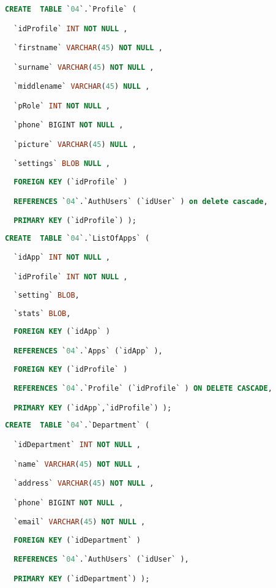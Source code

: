\begin{Code}
\begin{lstlisting}[language=SQL,breaklines=true, label=createProfile, caption=Create Profile, ]
CREATE  TABLE `04`.`Profile` (

  `idProfile` INT NOT NULL ,

  `firstname` VARCHAR(45) NOT NULL ,

  `surname` VARCHAR(45) NOT NULL ,

  `middlename` VARCHAR(45) NULL ,

  `pRole` INT NOT NULL ,

  `phone` BIGINT NOT NULL ,

  `picture` VARCHAR(45) NULL ,

  `settings` BLOB NULL ,
  
  FOREIGN KEY (`idProfile` )

  REFERENCES `04`.`AuthUsers` (`idUser` ) on delete cascade,

  PRIMARY KEY (`idProfile`) );
\end{lstlisting}
\end{Code}

\begin{Code}
\begin{lstlisting}[language=SQL,breaklines=true, label=createListOfApps, caption=Create ListOfApps, ]
CREATE  TABLE `04`.`ListOfApps` (

  `idApp` INT NOT NULL ,

  `idProfile` INT NOT NULL ,
  
  `setting` BLOB,
  
  `stats` BLOB,
  
  FOREIGN KEY (`idApp` )

  REFERENCES `04`.`Apps` (`idApp` ),
  
  FOREIGN KEY (`idProfile` )

  REFERENCES `04`.`Profile` (`idProfile` ) ON DELETE CASCADE,

  PRIMARY KEY (`idApp`,`idProfile`) );

\end{lstlisting}
\end{Code}

\begin{Code}
\begin{lstlisting}[language=SQL,breaklines=true, label=createDepartment, caption=Create Department, ]
CREATE  TABLE `04`.`Department` (

  `idDepartment` INT NOT NULL ,

  `name` VARCHAR(45) NOT NULL ,

  `address` VARCHAR(45) NOT NULL ,

  `phone` BIGINT NOT NULL ,

  `email` VARCHAR(45) NOT NULL ,
  
  FOREIGN KEY (`idDepartment` )

  REFERENCES `04`.`AuthUsers` (`idUser` ),

  PRIMARY KEY (`idDepartment`) );

\end{lstlisting}
\end{Code}

